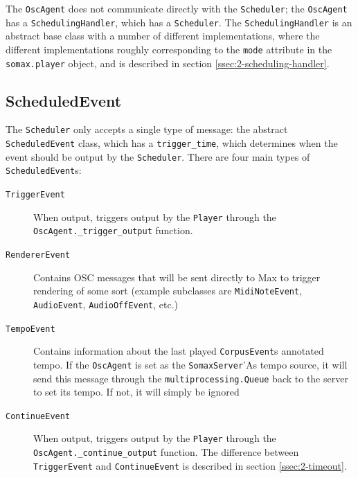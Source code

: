 The \texttt{OscAgent} does not communicate directly with the \texttt{Scheduler}; the \texttt{OscAgent} has a \texttt{SchedulingHandler}, which has a \texttt{Scheduler}. The \texttt{SchedulingHandler} is an abstract base class with a number of different implementations, where the different implementations roughly corresponding to the \texttt{mode} attribute in the \texttt{somax.player} object, and is described in section \ref{ssec:2-scheduling-handler}.



\subsection{ScheduledEvent}\label{ssec:2-scheduled-event}
The \texttt{Scheduler} only accepts a single type of message: the abstract \texttt{ScheduledEvent} class, which has a \texttt{trigger\_time}, which determines when the event should be output by the \texttt{Scheduler}. There are four main types of \texttt{ScheduledEvent}s:

\begin{description}
	\item[\texttt{TriggerEvent}] When output, triggers output by the \texttt{Player} through the \\\texttt{OscAgent.\_trigger\_output} function.
	\item[\texttt{RendererEvent}] Contains OSC messages that will be sent directly to Max to trigger rendering of some sort (example subclasses are \texttt{MidiNoteEvent}, \texttt{AudioEvent}, \texttt{AudioOffEvent}, etc.)
	\item[\texttt{TempoEvent}] Contains information about the last played \texttt{CorpusEvent}s annotated tempo. If the \texttt{OscAgent} is set as the \texttt{SomaxServer}'As tempo source, it will send this message through the \texttt{multiprocessing.Queue} back to the server to set its tempo. If not, it will simply be ignored
	\item[\texttt{ContinueEvent}] When output, triggers output by the \texttt{Player} through the \\ \texttt{OscAgent.\_continue\_output} function. The difference between \texttt{TriggerEvent} and \texttt{ContinueEvent} is described in section \ref{ssec:2-timeout}.
\end{description}



